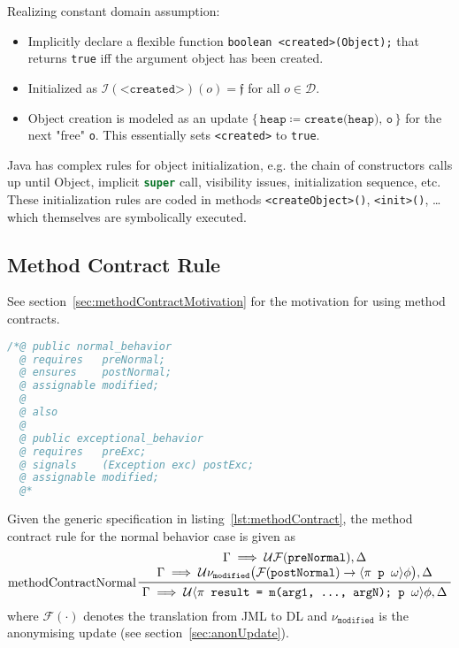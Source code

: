 \documentclass[a4paper, 11pt, accentcolor = tud3b]{tudreport}
\newcommand{\inlineJava}[1]{\lstinline[language = Java]|#1|}
\newcommand{\lf}{\ensuremath{\mathfrak{f}}}
\begin{document}
				Realizing constant domain assumption:
				\begin{itemize}
					\item Implicitly declare a flexible function \texttt{boolean <created>(Object);} that returns \texttt{true} iff the argument object has been created.
					\item Initialized as \( \mathcal{I}(\texttt{<created>})(o) = \lf \) for all \( o \in \mathcal{D} \).
					\item Object creation is modeled as an update \( \{\, \texttt{heap} \coloneqq \texttt{create(heap), o} \,\} \) for the next "free" \texttt{o}. This essentially sets \texttt{<created>} to \texttt{true}.
				\end{itemize}
				
				Java has complex rules for object initialization, e.g. the chain of constructors calls up until Object, implicit \inlineJava{super} call, visibility issues, initialization sequence, etc. These initialization rules are coded in methods \texttt{<createObject>()}, \texttt{<init>()}, \dots which themselves are symbolically executed.

			\subsection{Method Contract Rule}
				\label{sec:methodContract}
				
				See section~\ref{sec:methodContractMotivation} for the motivation for using method contracts.
				
				\begin{lstlisting}[caption = { Method Contract Rule Specification Example }, label = lst:methodContract, language = Java]
/*@ public normal_behavior
  @ requires   preNormal;
  @ ensures    postNormal;
  @ assignable modified;
  @
  @ also
  @
  @ public exceptional_behavior
  @ requires   preExc;
  @ signals    (Exception exc) postExc;
  @ assignable modified;
  @*
				\end{lstlisting}
				
				Given the generic specification in listing~\ref{lst:methodContract}, the method contract rule for the normal behavior case is given as
				\begin{equation*}
					\prftree[l]
						{methodContractNormal}
						{\let\scriptstyle\textstyle \substack{
						 \Gamma \implies \mathcal{U} \mathcal{F}(\texttt{preNormal}), \Delta \\
						 \Gamma \implies \mathcal{U} \nu_\texttt{modified} \big( \mathcal{F}(\texttt{postNormal}) \to \langle \pi \texttt{ p } \omega \rangle \phi \big), \Delta}}
						{\Gamma \implies \mathcal{U} \langle \pi \texttt{ result = m(arg1, ..., argN); p } \omega \rangle \phi, \Delta}
				\end{equation*}
				where \( \mathcal{F}(\cdot) \) denotes the translation from JML to DL and \( \nu_\texttt{modified} \) is the anonymising update (see section~\ref{sec:anonUpdate}).
				
\end{document}
